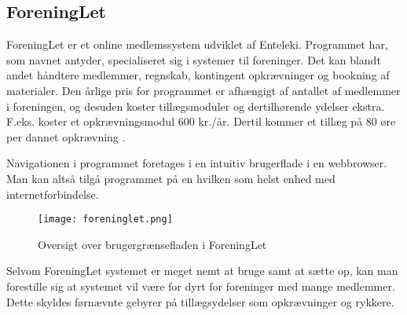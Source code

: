 \subsection{ForeningLet} %
\label{sub:ForeningLet}

ForeningLet er et online medlemssystem udviklet af Enteleki. Programmet har, som navnet antyder, specialiseret sig i systemer til foreninger. Det kan blandt andet håndtere medlemmer, regnskab, kontingent opkrævninger og bookning af materialer. Den årlige pris for programmet er afhængigt af antallet af medlemmer i foreningen, og desuden koster tillægsmoduler og dertilhørende ydelser ekstra. F.eks. koster et opkrævningsmodul 600 kr./år. Dertil kommer et tillæg på 80 øre per dannet opkrævning \cite{foreninglet}.

Navigationen i programmet foretages i en intuitiv brugerflade i en webbrowser. Man kan altså tilgå programmet på en hvilken som helst enhed med internetforbindelse. 

\begin{figure}
  \centering
  \texttt{[image: foreninglet.png]}
  \caption{Oversigt over brugergrænsefladen i ForeningLet}
  \label{fig:foreninglet_program}
\end{figure}


Selvom ForeningLet systemet er meget nemt at bruge samt at sætte op, kan man forestille sig at systemet vil være for dyrt for foreninger med mange medlemmer. Dette skyldes førnævnte gebyrer på tillægsydelser som opkrævninger og rykkere.


